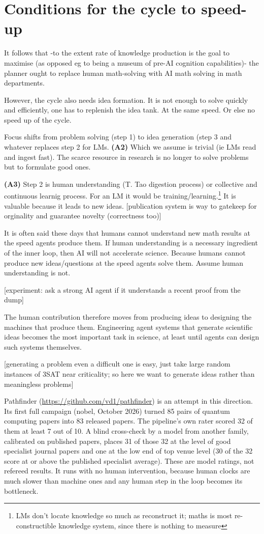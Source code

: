 \documentclass[10pt]{article}
\begin{document}
\section{Conditions for the cycle to speed-up}
It follows that -to the extent rate of knowledge production is the goal to
maximise (as opposed eg to being a museum of pre-AI cognition
capabilities)- the planner ought to replace human math-solving with AI math solving in
math departments.

However, the cycle also needs idea formation. It is not enough to solve quickly and efficiently,
one has to replenish the idea tank. At the same speed. Or else no speed up of the cycle.

Focus shifts from problem solving (step 1) to idea generation (step 3 and whatever
replaces step 2 for LMs. \textbf{(A2)} Which we assume is trivial (ie LMs read and ingest fast).
The
scarce resource in research is no longer to solve problems but to formulate
good ones. 

\textbf{(A3)} Step 2 is human understanding (T. Tao digestion process) or
collective and continuous learnig process. For an LM it would be
training/learning.\footnote{LMs don't locate knowledge so much as
reconstruct it; maths is most re-constructible knowledge system, since
there is nothing to measure} It is valuable because it leads to new ideas.
[publication system is way to gatekeep for orginality and guarantee novelty
(correctness too)]

It is often said these days that humans cannot understand new math results
at the speed agents produce them.   If human understanding is a necessary ingredient of the inner loop,
then AI will not accelerate science. Because humans cannot produce new
ideas/questions at the speed agents solve them. Assume human understanding
is not.

[experiment: ask a strong AI agent if it understands a recent proof from the dump]

The human contribution therefore moves from producing ideas to designing
the machines that produce them. Engineering agent systems that generate
scientific ideas becomes the most important task in science, at least until
agents can design such systems themselves.

[generating a problem even a difficult one is easy,
just take large random instances of 3SAT near criticality; so here we want to generate ideas
rather than meaningless problems]

Pathfinder (\url{https://github.com/vd1/pathfinder}) is an attempt in this direction. Its first full campaign
(nobel, October 2026) turned 85 pairs of quantum computing papers into 83 released papers. The pipeline's own rater
scored 32 of them at least 7 out of 10. A blind cross-check by a model from another family, calibrated on published
papers, places 31 of those 32 at the level of good specialist journal papers and one at the low end of top venue
level (30 of the 32 score at or above the published specialist average). These are model ratings, not refereed results. It runs with no human
intervention, because human clocks are much slower than machine ones and
any human step in the loop becomes its bottleneck.
\end{document}
